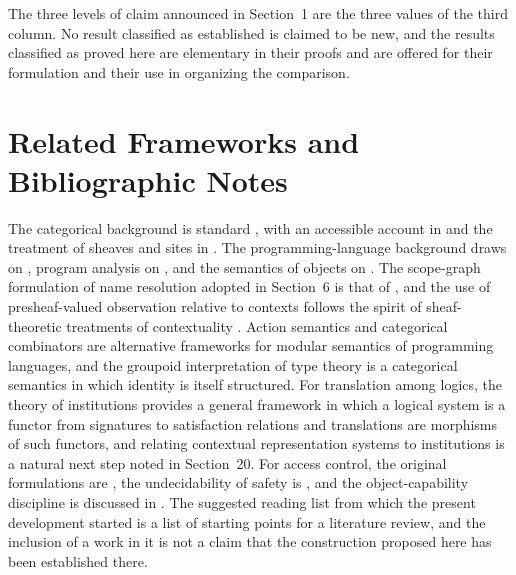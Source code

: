 \documentclass[11pt]{article}
\theoremstyle{definition}
\theoremstyle{remark}
\begin{document}
The three levels of claim announced in Section~1 are the three values of the third column. No result classified as established is claimed to be new, and the results classified as proved here are elementary in their proofs and are offered for their formulation and their use in organizing the comparison.

\section{Related Frameworks and Bibliographic Notes}

The categorical background is standard \cite{maclane,borceux}, with an accessible account in \cite{awodey} and the treatment of sheaves and sites in \cite{maclanemoerdijk}. The programming-language background draws on \cite{harper,pierce}, program analysis on \cite{nielson}, and the semantics of objects on \cite{abadicardelli}. The scope-graph formulation of name resolution adopted in Section~6 is that of \cite{scopegraphs}, and the use of presheaf-valued observation relative to contexts follows the spirit of sheaf-theoretic treatments of contextuality \cite{abramsky}. Action semantics \cite{mosses} and categorical combinators \cite{curien} are alternative frameworks for modular semantics of programming languages, and the groupoid interpretation of type theory \cite{hofmannstreicher} is a categorical semantics in which identity is itself structured. For translation among logics, the theory of institutions \cite{goguen} provides a general framework in which a logical system is a functor from signatures to satisfaction relations and translations are morphisms of such functors, and relating contextual representation systems to institutions is a natural next step noted in Section~20. For access control, the original formulations are \cite{lampson,dennisvanhorn}, the undecidability of safety is \cite{hru}, and the object-capability discipline is discussed in \cite{capmyths}. The suggested reading list from which the present development started is a list of starting points for a literature review, and the inclusion of a work in it is not a claim that the construction proposed here has been established there.
\end{document}
